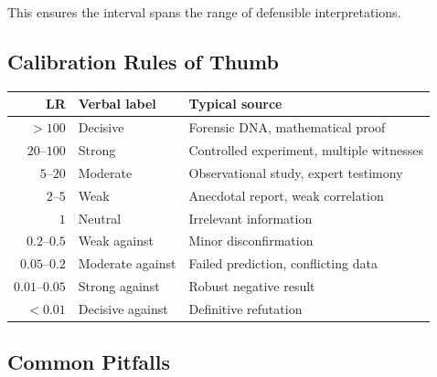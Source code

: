 \documentclass[11pt,a4paper]{article}
\begin{document}
This ensures the interval spans the range of defensible interpretations.

\subsection{Calibration Rules of Thumb}

\begin{center}
\begin{tabular}{rll}
\hline
\textbf{LR} & \textbf{Verbal label} & \textbf{Typical source} \\
\hline
$> 100$    & Decisive      & Forensic DNA, mathematical proof \\
$20$--$100$ & Strong        & Controlled experiment, multiple witnesses \\
$5$--$20$   & Moderate      & Observational study, expert testimony \\
$2$--$5$    & Weak          & Anecdotal report, weak correlation \\
$1$         & Neutral       & Irrelevant information \\
$0.2$--$0.5$ & Weak against  & Minor disconfirmation \\
$0.05$--$0.2$ & Moderate against & Failed prediction, conflicting data \\
$0.01$--$0.05$ & Strong against & Robust negative result \\
$< 0.01$   & Decisive against & Definitive refutation \\
\hline
\end{tabular}
\end{center}

\subsection{Common Pitfalls}
\end{document}
